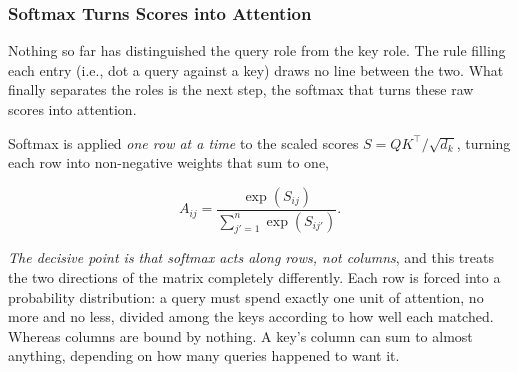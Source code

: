 \documentclass[11pt]{article}
\begin{document}
\subsubsection*{Softmax Turns Scores into Attention}

Nothing so far has distinguished the query role from the key role. The rule filling each entry (i.e., dot a query against a key) draws no line between the two. What finally separates the roles is the next step, the softmax that turns these raw scores into attention.


Softmax is applied \textit{one row at a time} to the scaled scores $S = QK^{\top}\!/\sqrt{d_k}$, turning each row into non-negative weights that sum to one,

\[
A_{ij} = \frac{\exp(S_{ij})}{\sum_{j'=1}^{n} \exp(S_{ij'})}.
\]

\textit{The decisive point is that softmax acts along rows, not columns}, and this treats the two directions of the matrix completely differently. Each row is forced into a probability distribution: a query must spend exactly one unit of attention, no more and no less, divided among the keys according to how well each matched. Whereas columns are bound by nothing. A key's column can sum to almost anything, depending on how many queries happened to want it. 
\end{document}
